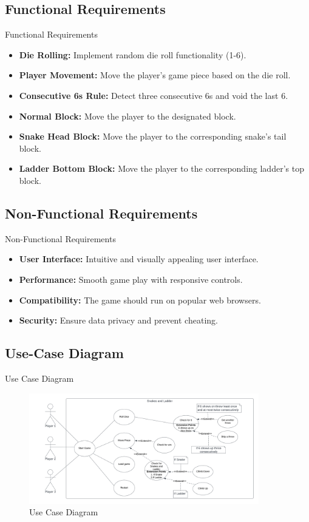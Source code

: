 \documentclass{beamer}
\begin{document}
\subsection{Functional Requirements}
\begin{frame}{Functional Requirements}
      \begin{itemize}
        \item \textbf{Die Rolling:} Implement random die roll functionality (1-6).
        \item \textbf{Player Movement:} Move the player's game piece based on the die roll.
        \item \textbf{Consecutive 6s Rule:} Detect three consecutive 6s and void the last 6.
        \item \textbf{Normal Block:} Move the player to the designated block.
        \item \textbf{Snake Head Block:} Move the player to the corresponding snake's tail block.
        \item \textbf{Ladder Bottom Block:} Move the player to the corresponding ladder's top block.
    \end{itemize}
\end{frame}
\subsection{Non-Functional Requirements}
\begin{frame}{Non-Functional Requirements}
        \begin{itemize}
        \item \textbf{User Interface:} Intuitive and visually appealing user interface.
        \item \textbf{Performance:} Smooth game play with responsive controls.
        \item \textbf{Compatibility:} The game should run on popular web browsers.
        \item \textbf{Security:} Ensure data privacy and prevent cheating.
    \end{itemize}
\end{frame}
\subsection{Use-Case Diagram}
\begin{frame}{Use Case Diagram}
    \begin{figure}
        \centering
        \includegraphics[width = 10cm]{Snakes and ladder.png}
        \caption{Use Case Diagram}
    \end{figure}
\end{frame}
\end{document}
